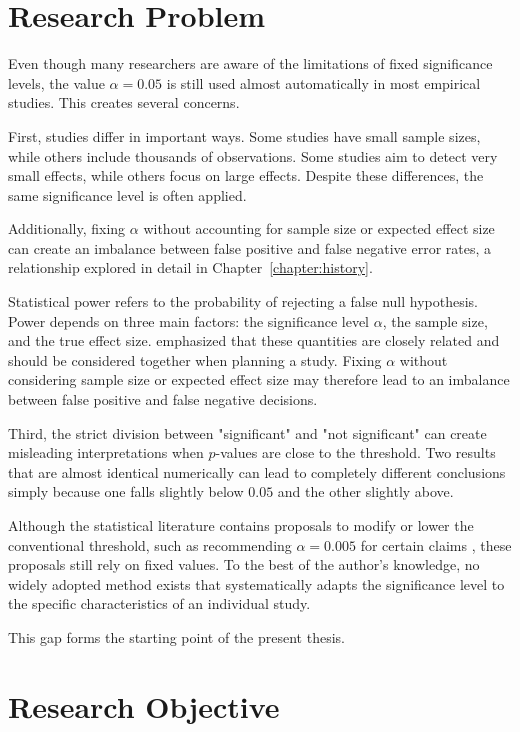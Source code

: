 \section{Research Problem}

Even though many researchers are aware of the limitations of fixed significance levels, the value $\alpha = 0.05$ is still used almost automatically in most empirical studies. This creates several concerns.

First, studies differ in important ways. Some studies have small sample sizes, while others include thousands of observations. Some studies aim to detect very small effects, while others focus on large effects. Despite these differences, the same significance level is often applied.

Additionally, fixing $\alpha$ without accounting for sample size 
or expected effect size can create an imbalance between false 
positive and false negative error rates, a relationship explored 
in detail in Chapter~\ref{chapter:history}.

Statistical power refers to the probability of rejecting a false null hypothesis\cite{Aberson2015}. Power depends on three main factors: the significance level $\alpha$, the sample size, and the true effect size. \cite{Cohen1988} emphasized that these quantities are closely related and should be considered together when planning a study. Fixing $\alpha$ without considering sample size or expected effect size may therefore lead to an imbalance between false positive and false negative decisions.

Third, the strict division between "significant" and "not significant" can create misleading interpretations when $p$-values are close to the threshold. Two results that are almost identical numerically can lead to completely different conclusions simply because one falls slightly below $0.05$ and the other slightly above.

Although the statistical literature contains proposals to modify or lower the conventional threshold, such as recommending $\alpha = 0.005$ for certain claims \cite{Benjamin2018}, these proposals still rely on fixed values. To the best of the author's knowledge, no widely adopted method exists that systematically adapts the significance level to the specific characteristics of an individual study.

This gap forms the starting point of the present thesis.
\section{Research Objective}

